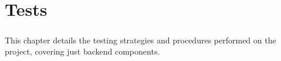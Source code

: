 \chapter{Tests}\label{ch:tests}

\paragraph{}This chapter details the testing strategies and procedures performed on the project, covering just backend components.


